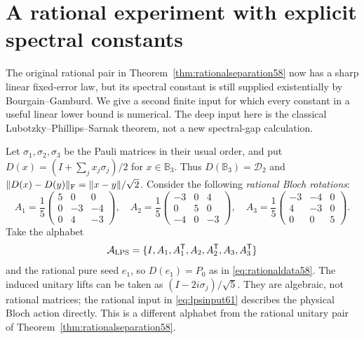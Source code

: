 \section{A rational experiment with explicit spectral constants}\label{sec:effective61}
The original rational pair in Theorem~\ref{thm:rationalseparation58}
now has a sharp linear fixed-error law, but its spectral constant is
still supplied existentially by Bourgain--Gamburd. We give a second
finite input for which every constant in a useful linear lower bound
is numerical. The deep input here is the classical
Lubotzky--Phillips--Sarnak theorem, not a new spectral-gap calculation.

Let $\sigma_1,\sigma_2,\sigma_3$ be the Pauli matrices in their usual
order, and put $D(x)=(I+\sum_jx_j\sigma_j)/2$ for $x\in\mathbb B_3$.
Thus $D(\mathbb B_3)=\mathcal D_2$ and
$\lVert D(x)-D(y)\rVert_{\rm F}=\lVert x-y\rVert/\sqrt2$.
Consider the following \emph{rational Bloch rotations}:
\begin{equation}\label{eq:lpsinput61}
 A_1=\frac15\begin{pmatrix}5&0&0\\0&-3&-4\\0&4&-3\end{pmatrix},\quad
 A_2=\frac15\begin{pmatrix}-3&0&4\\0&5&0\\-4&0&-3\end{pmatrix},\quad
 A_3=\frac15\begin{pmatrix}-3&-4&0\\4&-3&0\\0&0&5\end{pmatrix}.
\end{equation}
Take the alphabet
\[
 \mathcal A_{\rm LPS}=
       \{I,A_1,A_1^{\mathsf T},A_2,A_2^{\mathsf T},A_3,A_3^{\mathsf T}\}
\]
and the rational pure seed $e_1$, so $D(e_1)=P_0$ as in
\eqref{eq:rationaldata58}. The induced unitary lifts can be taken as
$(I-2i\sigma_j)/\sqrt5$. They are algebraic, not rational matrices;
the rational input in \eqref{eq:lpsinput61} describes the physical
Bloch action directly. This is a different alphabet from the rational
unitary pair of Theorem~\ref{thm:rationalseparation58}.

